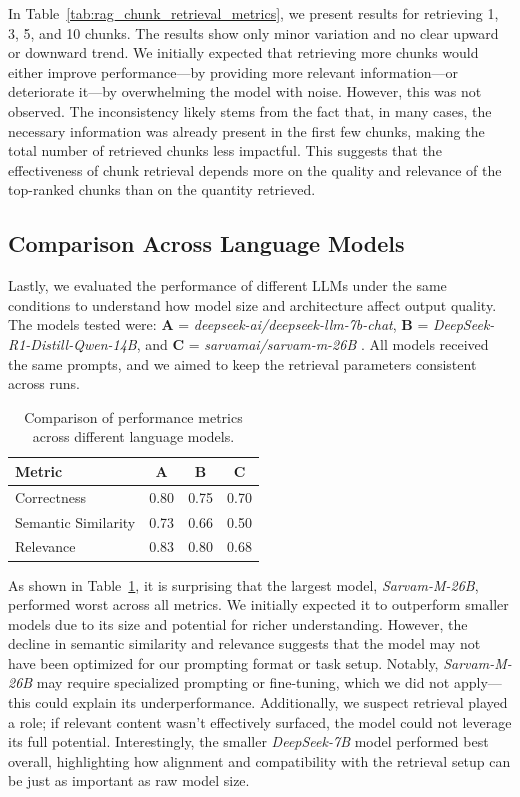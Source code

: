 \documentclass[fleqn,moreauthors,10pt]{ds_report}
\begin{document}
In Table~\ref{tab:rag_chunk_retrieval_metrics}, we present results for retrieving 1, 3, 5, and 10 chunks. The results show only minor variation and no clear upward or downward trend. We initially expected that retrieving more chunks would either improve performance—by providing more relevant information—or deteriorate it—by overwhelming the model with noise. However, this was not observed. The inconsistency likely stems from the fact that, in many cases, the necessary information was already present in the first few chunks, making the total number of retrieved chunks less impactful. This suggests that the effectiveness of chunk retrieval depends more on the quality and relevance of the top-ranked chunks than on the quantity retrieved.

\subsection*{Comparison Across Language Models}

Lastly, we evaluated the performance of different LLMs under the same conditions to understand how model size and architecture affect output quality. The models tested were: \textbf{A} = \textit{deepseek-ai/deepseek-llm-7b-chat}, \textbf{B} = \textit{DeepSeek-R1-Distill-Qwen-14B}, and \textbf{C} = \textit{sarvamai/sarvam-m-26B} \cite{sarvam2025sarvam}. All models received the same prompts, and we aimed to keep the retrieval parameters consistent across runs.

\begin{table}[ht]
\caption{Comparison of performance metrics across different language models.}
\centering
\begin{tabular}{lccc}
\toprule
\textbf{Metric} & \textbf{A} & \textbf{B} & \textbf{C} \\
\midrule
Correctness & 0.80 & 0.75 & 0.70 \\
Semantic Similarity & 0.73 & 0.66 & 0.50 \\
Relevance & 0.83 & 0.80 & 0.68 \\
\bottomrule
\end{tabular}
\label{tab:model_comparison}
\end{table}

As shown in Table~\ref{tab:model_comparison}, it is surprising that the largest model, \textit{Sarvam-M-26B}, performed worst across all metrics. We initially expected it to outperform smaller models due to its size and potential for richer understanding. However, the decline in semantic similarity and relevance suggests that the model may not have been optimized for our prompting format or task setup. Notably, \textit{Sarvam-M-26B} may require specialized prompting or fine-tuning, which we did not apply—this could explain its underperformance. Additionally, we suspect retrieval played a role; if relevant content wasn’t effectively surfaced, the model could not leverage its full potential. Interestingly, the smaller \textit{DeepSeek-7B} model performed best overall, highlighting how alignment and compatibility with the retrieval setup can be just as important as raw model size.
\end{document}
